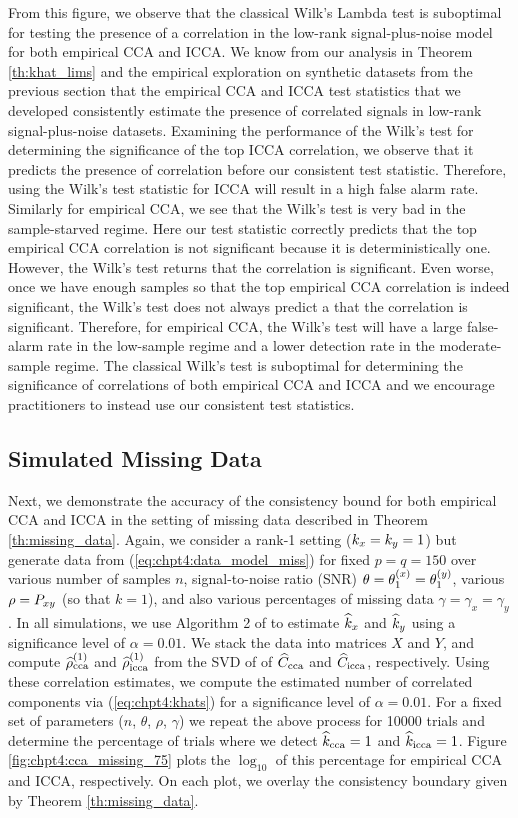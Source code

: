 From this figure, we observe that the classical Wilk's Lambda test is suboptimal for
testing the presence of a correlation in the low-rank signal-plus-noise model for both
empirical CCA and ICCA. We know from our analysis in Theorem \ref{th:khat_lims} and the
empirical exploration on synthetic datasets from the previous section that the empirical
CCA and ICCA test statistics that we developed consistently estimate the presence of
correlated signals in low-rank signal-plus-noise datasets. Examining the performance of
the Wilk's test for determining the significance of the top ICCA correlation, we observe
that it predicts the presence of correlation before our consistent test
statistic. Therefore, using the Wilk's test statistic for ICCA will result in a high false
alarm rate. Similarly for empirical CCA, we see that the Wilk's test is very bad in the
sample-starved regime. Here our test statistic correctly predicts that the top empirical
CCA correlation is not significant because it is deterministically one. However, the
Wilk's test returns that the correlation is significant. Even worse, once we have enough
samples so that the top empirical CCA correlation is indeed significant, the Wilk's test
does not always predict a that the correlation is significant. Therefore, for empirical
CCA, the Wilk's test will have a large false-alarm rate in the low-sample regime and a
lower detection rate in the moderate-sample regime. The classical Wilk's test is
suboptimal for determining the significance of correlations of both empirical CCA and ICCA
and we encourage practitioners to instead use our consistent test statistics.

\subsection{Simulated Missing Data}

Next, we demonstrate the accuracy of the consistency bound for both empirical CCA and ICCA
in the setting of missing data described in Theorem \ref{th:missing_data}. Again, we
consider a rank-1 setting ($k_x=k_y=1$) but generate data from
(\ref{eq:chpt4:data_model_miss}) for fixed $p=q=150$ over various number of samples $n$,
signal-to-noise ratio (SNR) $\theta=\theta^{(x)}_1=\theta^{(y)}_1$, various $\rho=P_{xy}$ (so that $k=1$), and
also various percentages of missing data $\gamma=\gamma_x=\gamma_y$. In all simulations,
we use Algorithm 2 of \cite{nadakuditi2010fundamental} to estimate $\widehat{k}_x$ and $\widehat{k}_y$
using a significance level of $\alpha=0.01$. We stack the data into matrices $X$ and $Y$,
and compute $\widehat{\rho}_\text{cca}^{(1)}$ and $\widehat{\rho}_\text{icca}^{(1)}$ from the SVD of of $\widehat{C}_{\text{cca}}$ and
$\widehat{C}_{\text{icca}}$, respectively. Using these correlation estimates, we compute the estimated
number of correlated components via (\ref{eq:chpt4:khats}) for a significance level of
$\alpha=0.01$. For a fixed set of parameters ($n$, $\theta$, $\rho$, $\gamma$) we repeat
the above process for 10000 trials and determine the percentage of trials where we detect
$\widehat{k}_{\text{cca}}=1$ and $\widehat{k}_{\text{icca}}=1$. Figure \ref{fig:chpt4:cca_missing_75} plots the
$\log_{10}$ of this percentage for empirical CCA and ICCA, respectively. On each plot, we
overlay the consistency boundary given by Theorem \ref{th:missing_data}.

